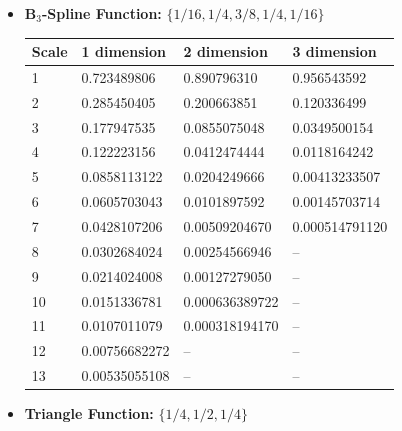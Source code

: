 \documentclass[12pt,a4paper]{article}
\begin{document}
\newpage
\begin{itemize}
\item {\bf B$_3$-Spline Function:} $\{1/16,1/4,3/8,1/4,1/16\}$

\begin{tabular}{llll}
Scale & 1 dimension      & 2 dimension     & 3 dimension\\ \hline
1     & 0.723489806      & 0.890796310     & 0.956543592\\
2     & 0.285450405	 & 0.200663851	   & 0.120336499\\
3     & 0.177947535	 & 0.0855075048	   & 0.0349500154\\
4     & 0.122223156	 & 0.0412474444	   & 0.0118164242\\
5     & 0.0858113122	 & 0.0204249666	   & 0.00413233507\\
6     & 0.0605703043	 & 0.0101897592	   & 0.00145703714\\
7     & 0.0428107206	 & 0.00509204670   & 0.000514791120\\
8     & 0.0302684024	 & 0.00254566946   & --\\
9     & 0.0214024008	 & 0.00127279050   & --\\
10    & 0.0151336781	 & 0.000636389722  & --\\
11    & 0.0107011079	 & 0.000318194170  & --\\
12    & 0.00756682272	 & --		   & --\\
13    & 0.00535055108	 & --		   & --\\
\end{tabular}

\item {\bf Triangle Function:} $\{1/4,1/2,1/4\}$


\end{itemize}
\end{document}
